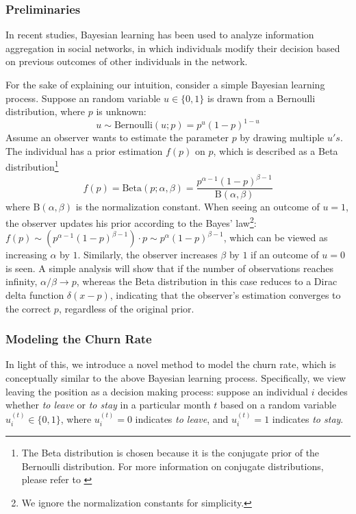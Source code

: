 \documentclass[tcn = 37075, sheet = false, abstract = false]{mcmthesis}
\begin{document}
\subsubsection{Preliminaries}

In recent studies, Bayesian learning has been used to analyze information aggregation in social networks\cite{acemoglu2011bayesian}, in which individuals modify their decision based on previous outcomes of other individuals in the network. 

For the sake of explaining our intuition, consider a simple Bayesian learning process. Suppose an random variable $u \in \{0, 1\}$ is drawn from a Bernoulli distribution, where $p$ is unknown:
\begin{equation}
u \sim \mathrm{Bernoulli}(u; p) = p^u(1-p)^{1-u}
\end{equation}
Assume an observer wants to estimate the parameter $p$ by drawing multiple $u's$. The individual has a prior estimation $f(p)$ on $p$, which is described as a Beta distribution\footnote{The Beta distribution is chosen because it is the conjugate prior of the Bernoulli distribution. For more information on conjugate distributions, please refer to  \cite{bishop2006pattern}}
\begin{equation}
 f(p) = \mathrm{Beta}(p; \alpha, \beta) = \frac{p^{\alpha - 1}(1-p)^{\beta - 1}}{\mathrm{B}(\alpha, \beta)}
\end{equation}
where $\mathrm{B}(\alpha, \beta)$ is the normalization constant.
When seeing an outcome of $u = 1$, the observer updates his prior according to the Bayes' law\footnote{We ignore the normalization constants for simplicity.}: $f(p) \sim (p^{\alpha-1}(1-p)^{\beta-1}) \cdot p \sim p^{\alpha}(1-p)^{\beta-1}$, which can be viewed as increasing $\alpha$ by $1$. Similarly, the observer increases $\beta$ by $1$ if an outcome of $u = 0$ is seen. A simple analysis will show that if the number of observations reaches infinity, $\alpha / \beta \rightarrow p$, whereas the Beta distribution in this case reduces to a Dirac delta function $\delta(x - p)$, indicating that the observer's estimation converges to the correct $p$, regardless of the original prior.

\subsubsection{Modeling the Churn Rate}

In light of this, we introduce a novel method to model the churn rate, which is conceptually similar to the above Bayesian learning process. Specifically, we view leaving the position as a decision making process: suppose an individual $i$ decides whether \textit{to leave} or \textit{to stay} in a particular month $t$ based on a random variable $u_{i}^{(t)} \in \{0, 1\}$, where $u_{i}^{(t)} = 0$ indicates \textit{to leave}, and $u_{i}^{(t)}=1$ indicates \textit{to stay}. 
\end{document}
